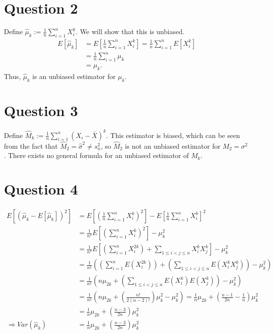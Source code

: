 \documentclass[11pt]{article} %
\begin{document}
\section{Question 2}
Define $\hat{\mu}_k:= \frac{1}{n}\sum_{i=1}^{n}X_i^k.$ We will show that this is unbiased.
\begin{align*}
E[\hat{\mu}_k] &= E\left[\frac{1}{n}\sum_{i=1}^{n}X_i^k\right] = \frac{1}{n}\sum_{i=1}^nE[X_i^k]\\
 &=\frac{1}{n}\sum_{i=1}^n\mu_k \\
&= \mu_k.
\end{align*}
Thus, $\hat{\mu}_k$ is an unbiased estimator for $\mu_k$.
\section{Question 3}
Define $\hat{M}_k:= \frac{1}{n}\sum_{i=1}^n (X_i - \bar{X})^k$. This estimator is biased, which can be seen from the fact that $\hat{M}_2 = \hat{\sigma}^2 \neq s_{n}^2$, so $\hat{M}_2$ is not an unbiased estimator for $M_2 = \sigma^2$. There exists no general formula for an unbiased estimator of $M_k.$
\section{Question 4}
\begin{align*}
E[(\hat{\mu}_k - E[\hat{\mu}_k])^2] &=  E\left[\left( \frac{1}{n}\sum_{i=1}^{n}X_i^k\right)^2\right] - E\left[\frac{1}{n}\sum_{i=1}^{n}X_i^k\right]^2 \\
&= \frac{1}{n^2}E\left[\left(\sum_{i=1}^{n}X_i^k\right)^2\right] - \mu_k^2 \\
&= \frac{1}{n^2}E\left[\left(\sum_{i=1}^{n}X_i^{2k}\right)+\sum_{1\leq i<j\leq n}X_i^k X_j^k\right] - \mu_k^2\\
&= \frac{1}{n^2}\left(\left(\sum_{i=1}^{n}E(X_i^{2k})\right) + \left(\sum_{1\leq i<j\leq n}E(X_i^k X_j^k)\right) -  \mu_k^2\right) \\
&= \frac{1}{n^2}\left(n\mu_{2k} + \left(\sum_{1\leq i<j\leq n}E(X_i^k)E(X_j^k)\right) -  \mu_k^2\right) \\
&= \frac{1}{n^2}\left(n\mu_{2k} + \left(\frac{n!}{2(n-2)!}\right)\mu_k^2 -  \mu_k^2\right)  = \frac{1}{n}\mu_{2k} + \left(\frac{n-1}{2n} - \frac{1}{n}\right)\mu_k^2\\
&= \frac{1}{n}\mu_{2k} + \left(\frac{n-3}{2n}\right)\mu_k^2\\
\Rightarrow Var(\hat{\mu}_k) &= \frac{1}{n}\mu_{2k} + \left(\frac{n-3}{2n}\right)\mu_k^2
\end{align*}
\end{document}
